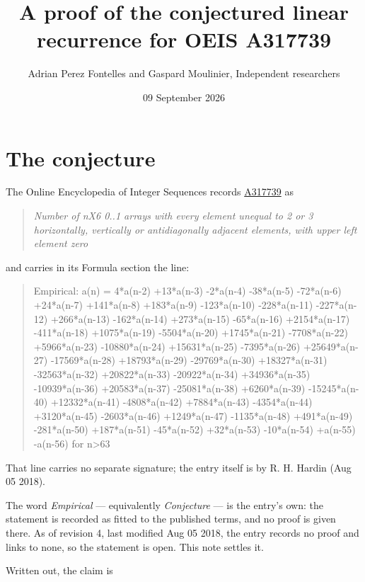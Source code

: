 \documentclass[11pt]{article}
\title{A proof of the conjectured linear recurrence for OEIS A317739}
\author{Adrian Perez Fontelles and Gaspard Moulinier, Independent researchers}
\date{09 September 2026}
\theoremstyle{definition}
\begin{document}
\maketitle
\section{The conjecture}

The Online Encyclopedia of Integer Sequences records \href{https://oeis.org/A317739}{A317739} as

\begin{quote}\itshape Number of nX6 0..1 arrays with every element unequal to 2 or 3 horizontally, vertically or antidiagonally adjacent elements, with upper left element zero\end{quote}

and carries in its Formula section the line:

\begin{quote}\ttfamily Empirical: a(n) = 4*a(n-2) +13*a(n-3) -2*a(n-4) -38*a(n-5) -72*a(n-6) +24*a(n-7) +141*a(n-8) +183*a(n-9) -123*a(n-10) -228*a(n-11) -227*a(n-12) +266*a(n-13) -162*a(n-14) +273*a(n-15) -65*a(n-16) +2154*a(n-17) -411*a(n-18) +1075*a(n-19) -5504*a(n-20) +1745*a(n-21) -7708*a(n-22) +5966*a(n-23) -10880*a(n-24) +15631*a(n-25) -7395*a(n-26) +25649*a(n-27) -17569*a(n-28) +18793*a(n-29) -29769*a(n-30) +18327*a(n-31) -32563*a(n-32) +20822*a(n-33) -20922*a(n-34) +34936*a(n-35) -10939*a(n-36) +20583*a(n-37) -25081*a(n-38) +6260*a(n-39) -15245*a(n-40) +12332*a(n-41) -4808*a(n-42) +7884*a(n-43) -4354*a(n-44) +3120*a(n-45) -2603*a(n-46) +1249*a(n-47) -1135*a(n-48) +491*a(n-49) -281*a(n-50) +187*a(n-51) -45*a(n-52) +32*a(n-53) -10*a(n-54) +a(n-55) -a(n-56) for n>63\end{quote}

That line carries no separate signature; the entry itself is by R. H. Hardin (Aug 05 2018).

The word {\itshape Empirical} --- equivalently {\itshape Conjecture} --- is the entry's own: the statement is recorded as fitted to the published terms, and no proof is given there. As of revision 4, last modified Aug 05 2018, the entry records no proof and links to none, so the statement is open. This note settles it.

Written out, the claim is
\end{document}
